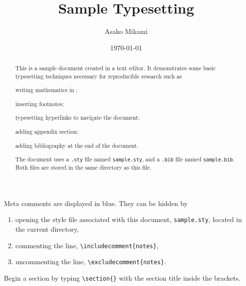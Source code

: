 \documentclass[12pt, notitlepage]{article}
\begin{document}
\title{Sample \latex Typesetting}
\author{Asako Mikami}
\date{\today}
\maketitle

\begin{abstract}
This is a sample document created in a \latex text editor. It demonstrates some basic \latex typesetting techniques necessary for reproducible research such as 
\begin{enumerate*}[label =\alph*)]
\item writing mathematics in \latex; 
\item inserting footnotes; 
\item typesetting hyperlinks to navigate the document; 
\item adding appendix section; 
\item adding bibliography at the end of the document. 
\end{enumerate*}
The document uses a \texttt{.sty} file named \texttt{sample.sty}, and a \texttt{.bib} file named \texttt{sample.bib}. Both files are stored in the same directory as this file. 
\end{abstract}


\begin{notes}
Meta comments are displayed in blue. They can be hidden by 
\begin{enumerate}
\item opening the style file associated with this document, \texttt{sample.sty}, located in the current directory,
\item commenting the line, \verb|\includecomment{notes}|, 
\item uncommenting the line, \verb|\excludecomment{notes}|.
\end{enumerate}
\end{notes}


\begin{notes}
Begin a section by typing \verb|\section{}| with the section title inside the brackets.
\end{notes}
\end{document}
